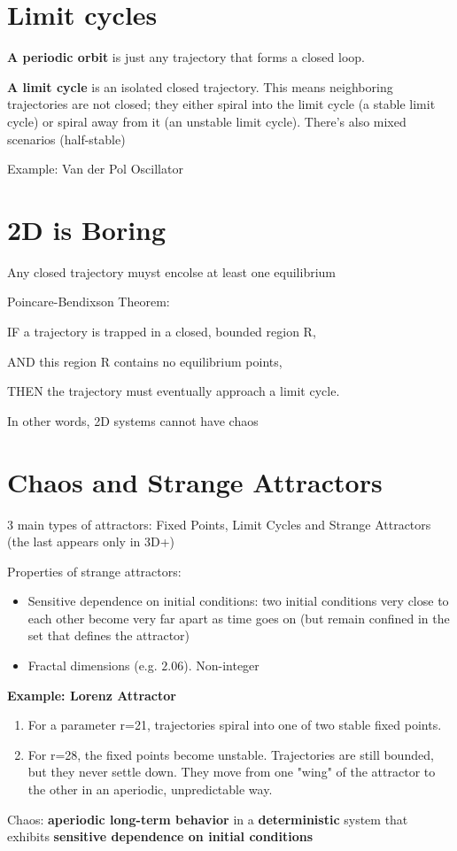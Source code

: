 \documentclass{report}
\begin{document}
\section*{Limit cycles}

\textbf{A periodic orbit} is just any trajectory that forms a closed loop.

\textbf{A limit cycle} is an isolated closed trajectory. 
This means neighboring trajectories are not closed; they either spiral into the limit cycle (a stable limit cycle) or spiral away from it (an unstable limit cycle).
There's also mixed scenarios (half-stable)

Example: Van der Pol Oscillator

\section*{2D is Boring}

\begin{theorem}
Any closed trajectory muyst encolse at least one equilibrium
\end{theorem}
\begin{theorem}{Poincare-Bendixson Theorem:}

IF a trajectory is trapped in a closed, bounded region R,

AND this region R contains no equilibrium points,

THEN the trajectory must eventually approach a limit cycle.
\end{theorem}

In other words, 2D systems cannot have chaos 

\section*{Chaos and Strange Attractors}

3 main types of attractors: Fixed Points, Limit Cycles and Strange Attractors (the last 
appears only in 3D+)

Properties of strange attractors:
\begin{itemize}
  \item Sensitive dependence on initial conditions: two initial conditions very 
  close to each other become very far apart as time goes on (but remain confined in the set 
  that defines the attractor)
  \item Fractal dimensions (e.g. $2.06$). Non-integer
\end{itemize}

\textbf{Example: Lorenz Attractor}
\begin{enumerate}
  \item For a parameter r=21, trajectories spiral into one of two stable fixed points.
  \item For r=28, the fixed points become unstable. Trajectories are still 
  bounded, but they never settle down. They move from one "wing" of the 
  attractor to the other in an aperiodic, unpredictable way.
\end{enumerate}

\begin{definition}
Chaos: \textbf{aperiodic long-term behavior} in a \textbf{deterministic} system that exhibits 
\textbf{sensitive dependence on initial conditions}
\end{definition}
\end{document}
